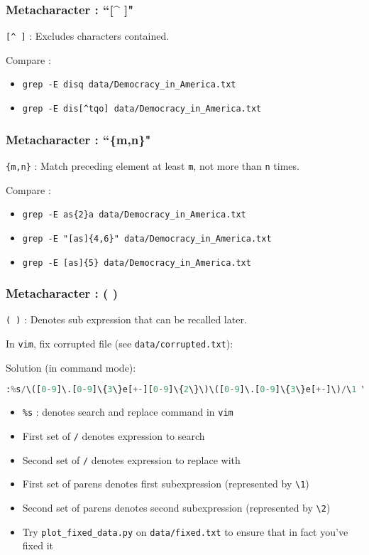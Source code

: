 \documentclass{beamer}
\newcommand{\code}[1]{\colorbox{codegray}{\texttt{#1}}}
\begin{document}
\begin{frame}
\frametitle{Metacharacter : ``[\^{} ]"}
\code{[\^{} ]} : Excludes characters contained. 
\bigskip

Compare :
\begin{itemize}
    \item \code{grep -E disq data/Democracy\_in\_America.txt}
    \pause
    \item \code{grep -E dis[\^{}tqo] data/Democracy\_in\_America.txt}
\end{itemize}
\end{frame}

\begin{frame}
\frametitle{Metacharacter : ``\{m,n\}"}
\code{\{m,n\}} : Match preceding element at least \code{m}, not more than \code{n} times.
\bigskip

Compare :
\begin{itemize}
    \item \code{grep -E as\{2\}a data/Democracy\_in\_America.txt}
    \pause
    \item \code{grep -E "[as]\{4,6\}" data/Democracy\_in\_America.txt}
    \pause
    \item \code{grep -E [as]\{5\} data/Democracy\_in\_America.txt}
\end{itemize}
\end{frame}

\begin{frame}[fragile]
\frametitle{Metacharacter : ( ) }
\begingroup
\code{( )} : Denotes sub expression that can be recalled later.

\bigskip

In \code{vim}, fix corrupted file (see \code{data/corrupted.txt}):
\bigskip

Solution (in command mode):
\begin{lstlisting}[backgroundcolor = \color{codegray}, language = Python, showstringspaces=false, breaklines=true]
:%s/\([0-9]\.[0-9]\{3\}e[+-][0-9]\{2\}\)\([0-9]\.[0-9]\{3\}e[+-]\)/\1 \2/gc
\end{lstlisting}
\endgroup

\scriptsize
\begin{itemize}
    \item \code{\%s} : denotes search and replace command in \code{vim}
    \pause
    \item First set of \code{/} denotes expression to search
    \pause
    \item Second set of \code{/} denotes expression to replace with
    \pause
    \item First set of parens denotes first subexpression (represented by \code{\textbackslash 1})
    \pause
    \item Second set of parens denotes second subexpression (represented by \code{\textbackslash 2})
    \pause
    \item Try \code{plot\_fixed\_data.py} on \code{data/fixed.txt} to ensure that in fact you've fixed it
\end{itemize}



\end{frame}
\end{document}
